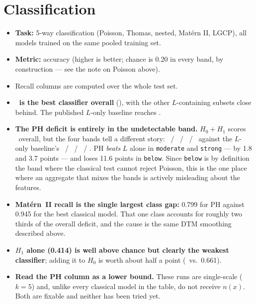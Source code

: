 \documentclass[10pt,a4paper]{article}
\begin{document}
\section{Classification}

\begin{itemize}
  \item \textbf{Task:} 5-way classification (Poisson, Thomas, nested, Mat\'ern II, LGCP), all models trained on the same pooled training set.
  \item \textbf{Metric:} accuracy (higher is better; chance is 0.20 in every band, by construction --- see the note on Poisson above).
  \item Recall columns are computed over the whole test set.
\end{itemize}



\begin{itemize}
  \item \textbf{\bestclassicalname\ is the best classifier overall} (\bestclassical), with the other $L$-containing subsets close behind. The published $L$-only baseline reaches \lonly.
  \item \textbf{The PH deficit is entirely in the undetectable band.} $H_0{+}H_1$ scores \bestph\ overall, but the four bands tell a different story: \phbelow\ / \phweak\ / \phmoderate\ / \phstrong\ against the $L$-only baseline's \lonlyxbelow\ / \lonlyxweak\ / \lonlyxmoderate\ / \lonlyxstrong. PH \emph{beats} $L$ alone in \texttt{moderate} and \texttt{strong} --- by 1.8 and 3.7 points --- and loses 11.6 points in \texttt{below}. Since \texttt{below} is by definition the band where the classical test cannot reject Poisson, this is the one place where an aggregate that mixes the bands is actively misleading about the features.
  \item \textbf{Mat\'ern~II recall is the single largest class gap:} 0.799 for PH against 0.945 for the best classical model. That one class accounts for roughly two thirds of the overall deficit, and the cause is the same DTM smoothing described above.
  \item \textbf{$H_1$ alone (0.414) is well above chance but clearly the weakest classifier}; adding it to $H_0$ is worth about half a point (\bestph\ vs.\ 0.661).
  \item \textbf{Read the PH column as a lower bound.} These runs are single-scale ($k=5$) and, unlike every classical model in the table, do not receive $n(x)$. Both are fixable and neither has been tried yet.
\end{itemize}
\end{document}
